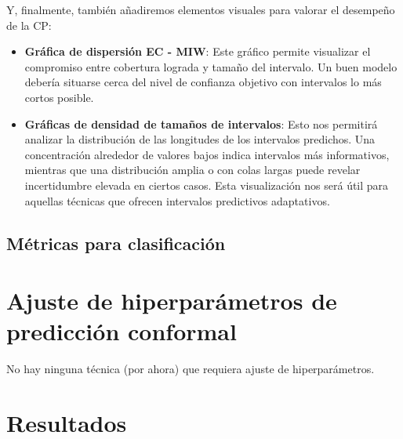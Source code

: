 Y, finalmente, también añadiremos elementos visuales para valorar el desempeño de la CP:

\begin{itemize}

    \item \textbf{Gráfica de dispersión EC - MIW}: Este gráfico permite visualizar el compromiso entre 
    cobertura lograda y tamaño del intervalo. Un buen modelo debería situarse cerca del nivel de confianza 
    objetivo con intervalos lo más cortos posible.
    
    \item \textbf{Gráficas de densidad de tamaños de intervalos}: Esto nos permitirá analizar la distribución 
    de las longitudes de los intervalos predichos. Una concentración alrededor de valores bajos indica 
    intervalos más informativos, mientras que una distribución amplia o con colas largas puede revelar
    incertidumbre elevada en ciertos casos. Esta visualización nos será útil para aquellas técnicas que 
    ofrecen intervalos predictivos adaptativos. 

\end{itemize}


\subsection{Métricas para clasificación}



\section{Ajuste de hiperparámetros de predicción conformal}

No hay ninguna técnica (por ahora) que requiera ajuste de hiperparámetros. 


\section{Resultados}





